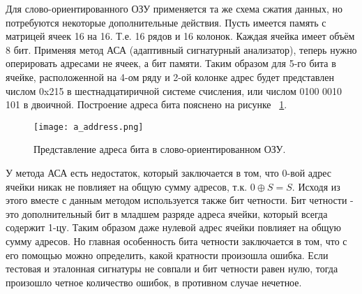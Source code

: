 Для слово-ориентированного ОЗУ применяется та же схема сжатия данных, но потребуются некоторые дополнительные действия. Пусть имеется память с матрицей ячеек 16 на 16. Т.е. 16 рядов и 16 колонок. Каждая ячейка имеет объём 8 бит. Применяя метод АСА (адаптивный сигнатурный анализатор), теперь нужно оперировать адресами не ячеек, а бит памяти. Таким образом для 5-го бита в ячейке, расположенной на 4-ом ряду и 2-ой колонке адрес будет представлен числом  0x215 в шестнадцатиричной системе счисления, или числом 0100 0010 101 в двоичной. Построение адреса бита пояснено на рисунке ~\ref{fig:arch_and_mod:memory_refresh:address}.

\begin{figure}[ht]
\centering
  \texttt{[image: a\_address.png]}  
  \caption{ Представление адреса бита в слово-ориентированном ОЗУ.}
  \label{fig:arch_and_mod:memory_refresh:address}
\end{figure}

У метода АСА есть недостаток, который заключается в том, что 0-вой адрес ячейки никак не повлияет на общую сумму адресов, т.к. $0 \oplus S = S$. Исходя из этого вместе с данным методом используется также бит четности\cite{March_Tests_Ivaniuk}. Бит четности - это дополнительный бит в младшем разряде адреса ячейки, который всегда содержит 1-цу. Таким образом даже нулевой адрес ячейки повлияет на общую сумму адресов. Но главная особенность бита четности заключается в том, что с его помощью можно определить, какой кратности произошла ошибка. Если тестовая и эталонная сигнатуры не совпали и бит четности равен нулю, тогда произошло четное количество ошибок, в противном случае нечетное.

